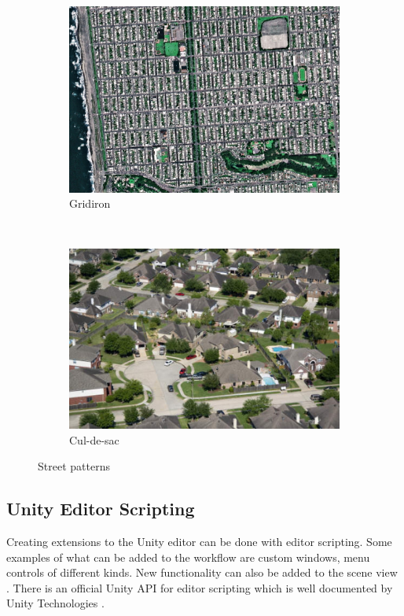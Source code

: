 \begin{figure}[H]
\centering
\begin{subfigure}{.4\linewidth}
  \centering
  \includegraphics[width=1\linewidth]{Planning report/images/grid_pattern.jpg}
  \caption{Gridiron}
  \label{fig:street_pattern}
\end{subfigure}
~
\begin{subfigure}{.4\linewidth}
  \centering
  \includegraphics[width=1\linewidth]{Planning report/images/culdesac.jpg}
  \caption{Cul-de-sac}
\end{subfigure}
\caption{Street patterns}
\label{fig:both_pattern}
\end{figure}

\subsection{Unity Editor Scripting}
Creating extensions to the Unity editor can be done with editor scripting. Some examples of what can be added to the workflow are custom windows, menu controls of different kinds. New functionality can also be added to the scene view \cite{unity-extending-editor}. There is an official Unity API for editor scripting which is well documented by Unity Technologies \cite{unity-editor-docs}.